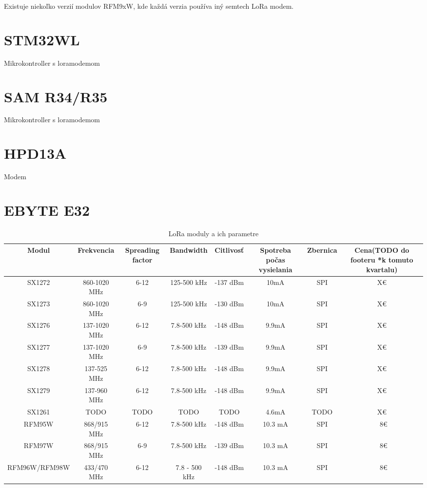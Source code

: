 \documentclass[slovak,master]{diploma}
\begin{document}
Existuje niekoľko verzií modulov RFM9xW, kde každá verzia používa iný semtech LoRa modem.

\section{STM32WL}
Mikrokontroller s loramodemom

\section{SAM R34/R35}
Mikrokontroller s loramodemom

\section{HPD13A}
Modem

\section {EBYTE E32}



\begin{table}
	\centering
  \small
  \setlength\tabcolsep{2pt}
	\caption[Parametre LoRa modulov]{LoRa moduly a ich parametre}
  \begin{tabular}{c|c|c|c|c|c|c|c}
    \toprule %
    Modul & Frekvencia & Spreading factor & Bandwidth & Citlivosť & Spotreba počas vysielania & Zbernica & Cena(TODO do footeru *k tomuto kvartalu)\\
    \midrule
    SX1272 & 860-1020 MHz & 6-12 & 125-500 kHz & -137 dBm & 10mA & SPI & X€ \\ 
    SX1273 & 860-1020 MHz & 6-9 & 125-500 kHz & -130 dBm & 10mA & SPI & X€ \\
    SX1276 & 137-1020 MHz & 6-12 & 7.8-500 kHz & -148 dBm & 9.9mA & SPI & X€ \\
    SX1277 & 137-1020 MHz & 6-9 & 7.8-500 kHz & -139 dBm & 9.9mA & SPI & X€ \\
    SX1278 & 137-525 MHz & 6-12 & 7.8-500 kHz & -148 dBm & 9.9mA & SPI & X€ \\
    SX1279 & 137-960 MHz & 6-12 & 7.8-500 kHz & -148 dBm & 9.9mA & SPI & X€ \\
    SX1261 & TODO & TODO & TODO & TODO & 4.6mA & TODO & X€ \\
    RFM95W & 868/915 MHz & 6-12 & 7.8-500 kHz & -148 dBm & 10.3 mA & SPI & ~8€ \\
    RFM97W & 868/915 MHz & 6-9 & 7.8-500 kHz & -139 dBm & 10.3 mA & SPI & ~8€ \\
    RFM96W/RFM98W & 433/470 MHz & 6-12 & 7.8 - 500 kHz & -148 dBm & 10.3 mA & SPI & ~8€ \\
    \midrule
  \end{tabular}
\end{table}
\end{document}
